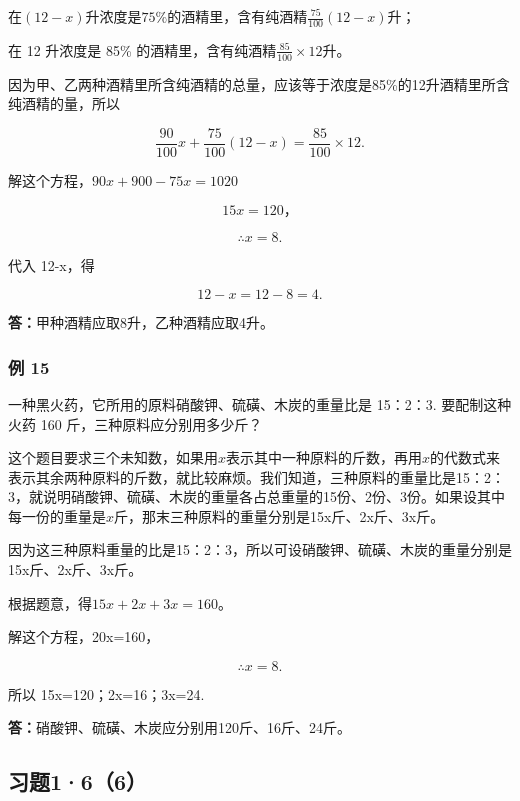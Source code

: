 在\((12 - x)\)升浓度是\(75\%\)的酒精里，含有纯酒精\(\frac{75}{100} (12 - x)\)升；

在 12 升浓度是 85\% 的酒精里，含有纯酒精\(\frac{85}{100} \times 12\)升。

因为甲、乙两种酒精里所含纯酒精的总量，应该等于浓度是85\%的12升酒精里所含纯酒精的量，所以

\[
\frac{90}{100} x + \frac{75}{100} (12 - x) = \frac{85}{100} \times 12.
\]

解这个方程，\(90x+900-75x=1020\)

\[
15 x = 120\text{，}
\]

\[
\therefore x = 8.
\]

代入 12-x，得

\[
12 - x = 12 - 8 = 4.
\]

\textbf{答：}甲种酒精应取8升，乙种酒精应取4升。

\subsubsection{例 15}

一种黑火药，它所用的原料硝酸钾、硫磺、木炭的重量比是 15：2：3.
要配制这种火药 160 斤，三种原料应分别用多少斤？

这个题目要求三个未知数，如果用\(x\)表示其中一种原料的斤数，再用\(x\)的代数式来表示其余两种原料的斤数，就比较麻烦。我们知道，三种原料的重量比是15：2：3，就说明硝酸钾、硫磺、木炭的重量各占总重量的15份、2份、3份。如果设其中每一份的重量是\(x\)斤，那末三种原料的重量分别是15x斤、2x斤、3x斤。

因为这三种原料重量的比是15：2：3，所以可设硝酸钾、硫磺、木炭的重量分别是15x斤、2x斤、3x斤。

根据题意，得\(15x + 2x + 3x = 160\)。

解这个方程，20x=160，

\[
\therefore x = 8.
\]

所以 15x=120；2x=16；3x=24.

\textbf{答：}硝酸钾、硫磺、木炭应分别用120斤、16斤、24斤。

\subsection{习题1·6（6）}

